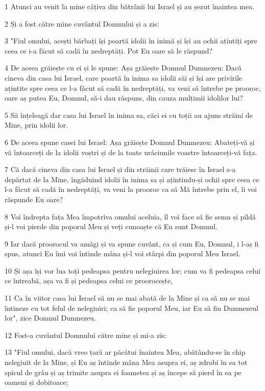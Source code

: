\par 1 Atunci au venit la mine câțiva din bătrânii lui Israel și au șezut înaintea mea.
\par 2 Și a fost către mine cuvântul Domnului și a zis:
\par 3 "Fiul omului, acești bărbați își poartă idolii în inimă și își au ochii ațintiți spre ceea ce i-a făcut să cadă în nedreptăți. Pot Eu oare să le răspund?
\par 4 De aceea grăiește cu ei și le spune: Așa grăiește Domnul Dumnezeu: Dacă cineva din casa lui Israel, care poartă în inima sa idolii săi și își are privirile ațintite spre ceea ce l-a făcut să cadă în nedreptăți, va veni să întrebe pe prooroc, oare aș putea Eu, Domnul, să-i dau răspuns, din cauza mulțimii idolilor lui?
\par 5 Să înțeleagă dar casa lui Israel în inima sa, căci ei cu toții au ajuns străini de Mine, prin idolii lor.
\par 6 De aceea spune casei lui Israel: Așa grăiește Domnul Dumnezeu: Abateți-vă și vă întoarceți de la idolii voștri și de la toate urâciunile voastre întoarceți-vă fața.
\par 7 Că dacă cineva din casa lui Israel și din străinii care trăiesc în Israel s-a depărtat de la Mine, îngăduind idolii în inima sa și ațintindu-și ochii spre ceea ce l-a făcut să cadă în nedreptăți, va veni la prooroc ca să Mă întrebe prin el, îi voi răspunde Eu oare?
\par 8 Voi îndrepta fața Mea împotriva omului aceluia, îl voi face să fie semn și pildă și-l voi pierde din poporul Meu și veți cunoaște că Eu sunt Domnul.
\par 9 Iar dacă proorocul va amăgi și va spune cuvânt, ca și cum Eu, Domnul, i l-aș fi spus, atunci Eu îmi voi întinde mâna și-l voi stârpi din poporul Meu Israel.
\par 10 Și așa își vor lua toți pedeapsa pentru nelegiuirea lor; cum va fi pedeapsa celui ce întreabă, așa va fi și pedeapsa celui ce proorocește,
\par 11 Ca în viitor casa lui Israel să nu se mai abată de la Mine și ca să nu se mai întineze cu tot felul de nelegiuiri; ca să fie poporul Meu, iar Eu să fiu Dumnezeul lor", zice Domnul Dumnezeu.
\par 12 Fost-a cuvântul Domnului către mine și mi-a zis:
\par 13 "Fiul omului, dacă vreo țară ar păcătui înaintea Mea, abătându-se în chip nelegiuit de la Mine, și Eu aș întinde mâna Mea asupra ei, aș zdrobi în ea tot spicul de grâu și aș trimite asupra ei foametea și aș începe să pierd în ea pe oameni și dobitoace;
